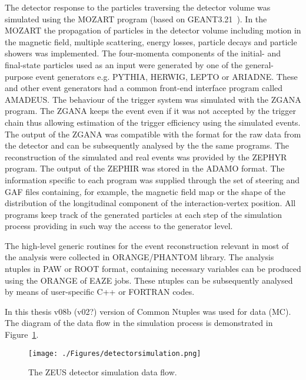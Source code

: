 The detector response to the particles traversing the detector volume was simulated using the MOZART program (based on GEANT3.21~\cite{tech:cern-dd-ee-84-1}). In the MOZART the propagation of particles in the detector volume including motion in the magnetic field, multiple scattering, energy losses, particle decays and particle showers was implemented. The four-momenta components of the initial- and final-state particles used as an input were generated by one of the general-purpose event generators e.g. PYTHIA, HERWIG, LEPTO or ARIADNE. These and other event generators had a common front-end interface program called AMADEUS. The behaviour of the trigger system was simulated with the ZGANA program. The ZGANA keeps the event even if it was not accepted by the trigger chain thus allowing estimation of the trigger efficiency using the simulated events. The output of the ZGANA was compatible with the format for the raw data from the detector and can be subsequently analysed by the the same programs. The reconstruction of the simulated and real events was provided by the ZEPHYR program. The output of the ZEPHIR was stored in the ADAMO format. The information specific to each program was supplied through the set of steering and GAF files containing, for example, the magnetic field map or the shape of the distribution of the longitudinal component of the interaction-vertex position. All programs keep track of the generated particles at each step of the simulation process providing in such way the access to the generator level.

The high-level generic routines for the event reconstruction relevant in most of the analysis were collected in ORANGE/PHANTOM library. The analysis ntuples in PAW or ROOT format, containing necessary variables can be produced using the ORANGE of EAZE jobs. These ntuples can be subsequently analysed by means of user-specific C++ or FORTRAN codes. 

In this thesis v08b (v02?) version of Common Ntuples was used for data (MC). The diagram of the data flow in the simulation process is demonstrated in Figure~\ref{fig:detectorsimulation}.

\begin{figure}[p]
	\centering
		\texttt{[image: ./Figures/detectorsimulation.png]}
	\caption{The ZEUS detector simulation data flow.}
	\label{fig:detectorsimulation}
\end{figure}
